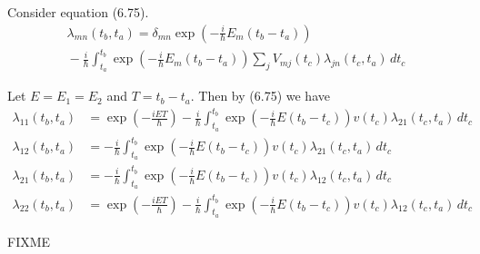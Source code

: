 


\bigskip
Consider equation (6.75).
\begin{multline*}
\lambda_{mn}(t_b,t_a)=\delta_{mn}
\exp\left(-\frac{i}{\hbar}E_m(t_b-t_a)\right)
\\
{}-\frac{i}{\hbar}
\int_{t_a}^{t_b}
\exp\left(-\frac{i}{\hbar}E_m(t_b-t_a)\right)
\sum_jV_{mj}(t_c)\lambda_{jn}(t_c,t_a)\,dt_c
\tag{6.75}
\end{multline*}

Let $E=E_1=E_2$ and $T=t_b-t_a$.
Then by (6.75) we have
\begin{align*}
\lambda_{11}(t_b,t_a)&=
\exp\left(-\frac{iET}{\hbar}\right)
-\frac{i}{\hbar}
\int_{t_a}^{t_b}
\exp\left(-\frac{i}{\hbar}E(t_b-t_c)\right)
v(t_c)\lambda_{21}(t_c,t_a)\,dt_c
\\
\lambda_{12}(t_b,t_a)&=
-\frac{i}{\hbar}
\int_{t_a}^{t_b}
\exp\left(-\frac{i}{\hbar}E(t_b-t_c)\right)
v(t_c)\lambda_{21}(t_c,t_a)\,dt_c
\\
\lambda_{21}(t_b,t_a)&=
-\frac{i}{\hbar}
\int_{t_a}^{t_b}
\exp\left(-\frac{i}{\hbar}E(t_b-t_c)\right)
v(t_c)\lambda_{12}(t_c,t_a)\,dt_c
\\
\lambda_{22}(t_b,t_a)&=
\exp\left(-\frac{iET}{\hbar}\right)
-\frac{i}{\hbar}
\int_{t_a}^{t_b}
\exp\left(-\frac{i}{\hbar}E(t_b-t_c)\right)
v(t_c)\lambda_{12}(t_c,t_a)\,dt_c
\end{align*}

FIXME


